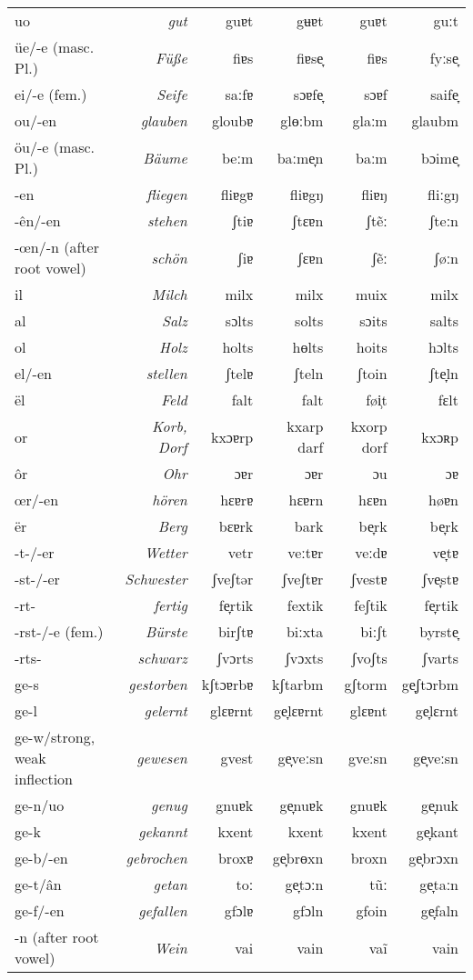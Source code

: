 \documentclass[output=paper]{langscibook}
\begin{document}
{\begin{longtable}{lrrrrr}
{uo} & \textit{gut} & guɐt & gʉɐt & guɐt & guːt\\
{üe/-e (masc. Pl.)} & \textit{Füße} & fiɐs & fiɐse̞ & fiɐs & fyːse̞\\
{ei/-e (fem.)} & \textit{Seife} & saːfɐ & sɔɐfe̞ & sɔɐf & saife̞\\
{ou/-en} & \textit{glauben} & gloubɐ & glɵːbm & glaːm & glaubm\\
{öu/-e (masc. Pl.)} & \textit{Bäume} & beːm & baːme̞n & baːm & bɔime̞\\
{-en} & \textit{fliegen} & fliɐgɐ & fliɐgŋ & fliɐŋ & fliːgŋ\\
{{}-ên/-en} & \textit{stehen} & ʃtiɐ & ʃtɛɐn & ʃtẽː & ʃteːn\\
{{}-œn/-n (after root vowel)} & \textit{schön} & ʃiɐ & ʃɛɐn & ʃẽː & ʃøːn\\
{il} & \textit{Milch} & milx & milx & muix & milx\\
{al} & \textit{Salz} & sɔlts & solts & sɔits & salts\\
{ol} & \textit{Holz} & holts & hɵlts & hoits & hɔlts\\
{el/-en} & \textit{stellen} & ʃtelɐ & ʃteln & ʃtoin & ʃte̞ln\\
{ël} & \textit{Feld} & falt & falt & føi̹t & fɛlt\\
{or} & \textit{Korb, Dorf} & kxɔɐrp & kxarp darf & kxorp dorf & kxɔʀp\\
{ôr} & \textit{Ohr} & ɔɐr & ɔɐr & ɔu & ɔɐ\\
{œr/-en} & \textit{hören} & hɛɐrɐ & hɛɐrn & hɛɐn & høɐn\\
{ër} & \textit{Berg} & bɛɐrk & bark & be̞rk & be̞rk\\
{{}-t-/-er} & \textit{Wetter} & vetr & veːtɐr & veːdɐ & ve̞tɐ\\
{{}-st-/-er} & \textit{Schwester} & ʃveʃtər & ʃveʃtɐr & ʃvestɐ & ʃve̞stɐ\\
{{}-rt-} & \textit{fertig} & fe̞rtik & fextik & feʃtik & fe̞rtik\\
{{}-rst-/-e (fem.)} & \textit{Bürste} & birʃtɐ & biːxta & biːʃt & byrste̞\\
{{}-rts-} & \textit{schwarz} & ʃvɔrts & ʃvɔxts & ʃvoʃts & ʃvarts\\
{ge-s} & \textit{gestorben} & kʃtɔɐrbɐ & kʃtarbm & gʃtorm & ge̞ʃtɔrbm\\
{ge-l} & \textit{gelernt} & glɛɐrnt & ge̞lɛɐrnt & glɛɐnt & ge̞lɛrnt\\
{ge-w/strong, weak inflection} & \textit{gewesen} & gvest & ge̞veːsn & gveːsn & ge̞veːsn\\
{ge-n/uo} & \textit{genug} & gnuɐk & ge̞nuɐk & gnuɐk & ge̞nuk\\
{ge-k} & \textit{gekannt} & kxent & kxent & kxent & ge̞kant\\
{ge-b/-en} & \textit{gebrochen} & broxɐ & ge̞brɵxn & broxn & ge̞brɔxn\\
{ge-t/ân} & \textit{getan} & toː & ge̞tɔːn & tũː & ge̞taːn\\
{ge-f/-en} & \textit{gefallen} & gfɔlɐ & gfɔln & gfoin & ge̞faln\\
{-n (after root vowel)} & \textit{Wein} & vai & vain & vaĩ & vain\\
\end{longtable}}

\printbibliography[heading=subbibliography,notkeyword=this]
\end{document}
